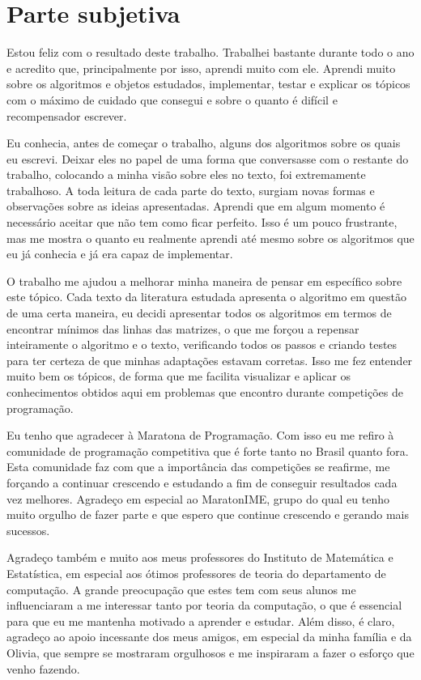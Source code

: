 \chapter{Parte subjetiva}
\label{Subjetiva}

Estou feliz com o resultado deste trabalho. Trabalhei bastante durante todo o ano e acredito que, principalmente por isso, aprendi muito com ele. Aprendi muito sobre os algoritmos e objetos estudados, implementar, testar e explicar os tópicos com o máximo de cuidado que consegui e sobre o quanto é difícil e recompensador escrever. 

Eu conhecia, antes de começar o trabalho, alguns dos algoritmos sobre os quais eu escrevi. Deixar eles no papel de uma forma que conversasse com o restante do trabalho, colocando a minha visão sobre eles no texto, foi extremamente trabalhoso. A toda leitura de cada parte do texto, surgiam novas formas e observações sobre as ideias apresentadas. Aprendi que em algum momento é necessário aceitar que não tem como ficar perfeito. Isso é um pouco frustrante, mas me mostra o quanto eu realmente aprendi até mesmo sobre os algoritmos que eu já conhecia e já era capaz de implementar.

O trabalho me ajudou a melhorar minha maneira de pensar em específico sobre este tópico. Cada texto da literatura estudada apresenta o algoritmo em questão de uma certa maneira, eu decidi apresentar todos os algoritmos em termos de encontrar mínimos das linhas das matrizes, o que me forçou a repensar inteiramente o algoritmo e o texto, verificando todos os passos e criando testes para ter certeza de que minhas adaptações estavam corretas. Isso me fez entender muito bem os tópicos, de forma que me facilita visualizar e aplicar os conhecimentos obtidos aqui em problemas que encontro durante competições de programação.

Eu tenho que agradecer à Maratona de Programação. Com isso eu me refiro à comunidade de programação competitiva que é forte tanto no Brasil quanto fora. Esta comunidade faz com que a importância das competições se reafirme, me forçando a continuar crescendo e estudando a fim de conseguir resultados cada vez melhores. Agradeço em especial ao MaratonIME, grupo do qual eu tenho muito orgulho de fazer parte e que espero que continue crescendo e gerando mais sucessos. 

Agradeço também e muito aos meus professores do Instituto de Matemática e Estatística, em especial aos ótimos professores de teoria do departamento de computação. A grande preocupação que estes tem com seus alunos me influenciaram a me interessar tanto por teoria da computação, o que é essencial para que eu me mantenha motivado a aprender e estudar. Além disso, é claro, agradeço ao apoio incessante dos meus amigos, em especial da minha família e da Olivia, que sempre se mostraram orgulhosos e me inspiraram a fazer o esforço que venho fazendo.
